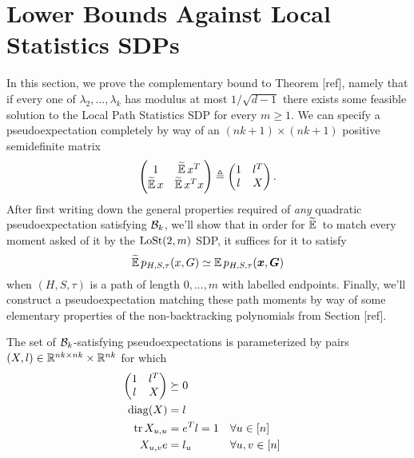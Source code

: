 \section{Lower Bounds Against Local Statistics SDPs}
\label{sec:lower bound}

In this section, we prove the complementary bound to Theorem [ref], namely that if every one of $\lambda_2,...,\lambda_k$ has modulus at most $1/\sqrt{d-1}$ there exists some feasible solution to the Local Path Statistics SDP for every $m \ge 1$. We can specify a pseudoexpectation completely by way of an $(nk + 1)\times(nk+1)$ positive semidefinite matrix
$$
   \begin{pmatrix} 1 & \widetilde{\operatorname*{\mathbb{E}}}\, x^T \\ \widetilde{\operatorname*{\mathbb{E}}}\, x & \widetilde{\operatorname*{\mathbb{E}}}\, x^Tx \end{pmatrix} 
    \triangleq \begin{pmatrix} 1 & l^T \\ l & X \end{pmatrix}.
$$
After first writing down the general properties required of \textit{any} quadratic pseudoexpectation satisfying $\mathcal{B}_k$, we'll show that in order for $\widetilde{\operatorname*{\mathbb{E}}}\,$ to match every moment asked of it by the $\operatorname{LoSt}(2,m)$ SDP, it suffices for it to satisfy
$$
    \widetilde{\operatorname*{\mathbb{E}}}\, p_{H,S,\tau}(x,G) \simeq \operatorname*{\mathbb{E}} p_{H,S,\tau}({\boldsymbol{x}},\boldsymbol{G})
$$
when $(H,S,\tau)$ is a path of length $0,...,m$ with labelled endpoints. Finally, we'll construct a pseudoexpectation matching these path moments by way of some elementary properties of the non-backtracking polynomials from Section [ref].

\begin{lemma}
    The set of $\mathcal{B}_k$-satisfying pseudoexpectations is parameterized by pairs $(X,l) \in \mathbb{R}^{nk\times nk}\times \mathbb{R}^{nk}$ for which
    \begin{align}
        \begin{pmatrix} 1 & l^T \\ l& X \end{pmatrix} &\succeq 0 \\
        \operatorname{diag}(X) &= l \\
        \operatorname{tr} X_{u,u} &= e^T l = 1 & &\forall u\in[n]  \\
        X_{u,v}e &= l_u & &\forall u,v\in[n]
    \end{align}
\end{lemma}


